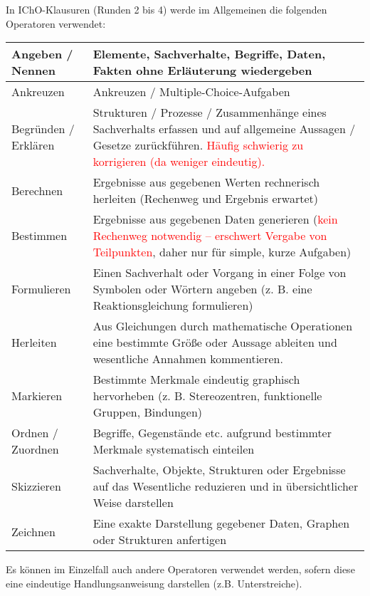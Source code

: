 \documentclass[./main.tex]{subfiles}
\begin{document}
\newpage
In IChO-Klausuren (Runden 2 bis 4) werde im Allgemeinen die folgenden Operatoren verwendet:\\
\begin{tabular}{|C{2.2cm}|L{13.7cm}|}\hline
Angeben / Nennen & Elemente, Sachverhalte, Begriffe, Daten, Fakten ohne Erl\"auterung wiedergeben \\\hline
Ankreuzen & Ankreuzen / Multiple-Choice-Aufgaben \\\hline
Begr\"unden / Erkl\"aren & Strukturen / Prozesse / Zusammenh\"ange eines Sachverhalts erfassen und auf allgemeine Aussagen / Gesetze zur\"uckf\"uhren.\newline
\textcolor{red}{H\"aufig schwierig zu korrigieren (da weniger eindeutig).} \\\hline
Berechnen & Ergebnisse aus gegebenen Werten rechnerisch herleiten (Rechenweg und Ergebnis erwartet)\\\hline
Bestimmen & Ergebnisse aus gegebenen Daten generieren (\textcolor{red}{kein Rechenweg notwendig -- erschwert Vergabe von Teilpunkten}, daher nur f\"ur simple, kurze Aufgaben)\\\hline
Formulieren & Einen Sachverhalt oder Vorgang in einer Folge von Symbolen oder W\"ortern angeben (z. B. eine Reaktionsgleichung formulieren) \\\hline
Herleiten & Aus Gleichungen durch mathematische Operationen eine bestimmte Gr\"o\ss{}e oder Aussage ableiten und wesentliche Annahmen kommentieren. \\\hline
Markieren & Bestimmte Merkmale eindeutig graphisch hervorheben
(z. B. Stereozentren, funktionelle Gruppen, Bindungen) \\\hline
Ordnen / Zuordnen & Begriffe, Gegenst\"ande etc. aufgrund bestimmter Merkmale systematisch einteilen \\\hline
Skizzieren & Sachverhalte, Objekte, Strukturen oder Ergebnisse auf das Wesentliche reduzieren und in \"ubersichtlicher Weise darstellen \\\hline
Zeichnen & Eine exakte Darstellung gegebener Daten, Graphen oder Strukturen anfertigen \\\hline
\end{tabular}

Es k\"onnen im Einzelfall auch andere Operatoren verwendet werden, sofern diese eine eindeutige Handlungsanweisung darstellen (z.B. Unterstreiche). 
\end{document}

